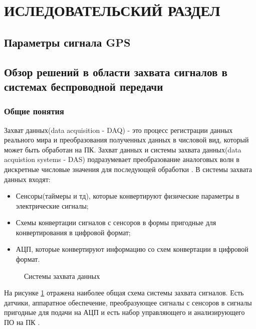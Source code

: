 \section{ИСЛЕДОВАТЕЛЬСКИЙ РАЗДЕЛ}
\subsection{Параметры сигнала GPS}
\label{razdel13}


\subsection{Обзор решений в области захвата сигналов в системах беспроводной передачи}
\subsubsection{Общие понятия}
\label{razdel13}
Захват данных(data acquisition - DAQ) - это процесс регистрации данных реального мира и преобразования полученных данных в 
числовой вид, который может быть обработан на ПК. Захват данных и системы захвата данных(data acquistion systems - DAS) подразумевает
преобразование аналоговых волн в дискретные числовые значения для последующей обработки \cite{ni_acq}. В системы захвата данных входят:

\begin{itemize}
\item Сенсоры(таймеры и тд), которые конвертируют физические параметры в электрические сигналы;
\item Схемы конвертации сигналов с сенсоров в формы пригодные для конвертирования в цифровой формат;
\item АЦП, которые конвертируют информацию со схем конвертации в цифровой формат.
\end{itemize}

\begin{figure}[H]
\caption{Системы захвата данных}
\label{pic_acq}
\end{figure}

На рисунке \ref{pic_acq} отражена наиболее общая схема системы захвата сигналов. Есть датчики, аппаратное обеспечение,
преобразующее сигналы с сенсоров в сигналы пригодные для подачи на АЦП и есть набор управляющего и анализирующего ПО
на ПК \cite{ni_acq}.

